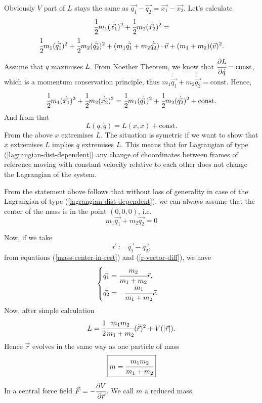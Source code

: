 \documentclass[main.tex]{subfiles}
\begin{document}
Obviously $V$ part of $L$ stays the same as $\vec{q_1} - \vec{q_2} = \vec{x_1} - \vec{x_2}$. Let's calculate
\begin{multline}
\cfrac{1}{2}m_1 (\dot{\vec{x_1}})^2 + \cfrac{1}{2}m_2 (\dot{\vec{x_2}})^2 = \\
\cfrac{1}{2}m_1 (\dot{\vec{q_1}})^2 + \cfrac{1}{2}m_2 (\dot{\vec{q_2}})^2 + (m_1\dot{\vec{q_1}} + m_2\dot{\vec{q_2}})\cdot \vec{v} + (m_1 + m_2)(\vec{v})^2.
\end{multline}
Assume that $q$ maximises $L$. From Noether Theorem, we know that $\cfrac{\partial L}{\partial \dot{q}} = \text{const}$, which is a momentum conservation principle, thus $m_1\dot{\vec{q_1}} + m_2\dot{\vec{q_2}}=\text{const}$. Hence,
\begin{equation}
\cfrac{1}{2}m_1 (\dot{\vec{x_1}})^2 + \cfrac{1}{2}m_2 (\dot{\vec{x_2}})^2 = \cfrac{1}{2}m_1 (\dot{\vec{q_1}})^2 + \cfrac{1}{2}m_2 (\dot{\vec{q_2}})^2 + \text{const}.
\end{equation}
And from that 
\begin{equation}
L(q,\dot{q}) = L(x,\dot{x}) + \text{const}.
\end{equation}
From the above $x$ extremises $L$. The situation is symetric if we want to show that $x$ extremises $L$ implies $q$ extremises $L$.
This means that for Lagrangian of type (\ref{lagrangian-dist-dependent}) any change of choordinates between frames of reference moving with constant velocity relative to each other does not change the Lagrangian of the system.

From the statement above follows that without loss of generality in case of the Lagrangian of type (\ref{lagrangian-dist-dependent}), we can always assume that the center of the mass is in the point $(0,0,0)$, i.e.
\begin{equation}
\label{mass-center-in-rest}
m_1\vec{q_1} + m_2\vec{q_2} = 0
\end{equation}

Now, if we take
\begin{equation}
\label{r-vector-diff}
\vec{r} := \vec{q_1} - \vec{q_2}, 
\end{equation}
from equations (\ref{mass-center-in-rest}) and (\ref{r-vector-diff}), we have
\begin{equation}
\begin{cases}
\vec{q_1} = \cfrac{m_2}{m_1 + m_2}\vec{r},\\
\vec{q_2} = - \cfrac{m_1}{m_1 + m_2}\vec{r}.
\end{cases}
\end{equation}
Now, after simple calculation
\begin{equation}
L = \cfrac{1}{2}\cfrac{m_1m_2}{m_1 + m_2}(\dot{\vec{r}})^2 + V(|\vec{r}|). 
\end{equation}
Hence $\vec{r}$ evolves in the same way as one particle of mass
\begin{equation}
\boxed{
m = \cfrac{m_1m_2}{m_1 + m_2}
}
\end{equation}
In a central force field $\vec{F} = - \cfrac{\partial V}{\partial \vec{r}}$. We call $m$ a reduced mass.
\end{document}
